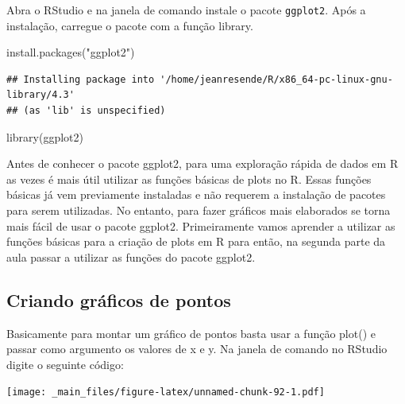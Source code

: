 \documentclass[
]{book}
\newenvironment{Shaded}{\begin{snugshade}}{\end{snugshade}}
\newcommand{\FunctionTok}[1]{\textcolor[rgb]{0.00,0.00,0.00}{#1}}
\newcommand{\NormalTok}[1]{#1}
\newcommand{\SpecialCharTok}[1]{\textcolor[rgb]{0.00,0.00,0.00}{#1}}
\newcommand{\StringTok}[1]{\textcolor[rgb]{0.31,0.60,0.02}{#1}}
\begin{document}
Abra o RStudio e na janela de comando instale o pacote \texttt{ggplot2}. Após a instalação, carregue o pacote com a função library.

\begin{Shaded}
\begin{Highlighting}[]
\FunctionTok{install.packages}\NormalTok{(}\StringTok{"ggplot2"}\NormalTok{)}
\end{Highlighting}
\end{Shaded}

\begin{verbatim}
## Installing package into '/home/jeanresende/R/x86_64-pc-linux-gnu-library/4.3'
## (as 'lib' is unspecified)
\end{verbatim}

\begin{Shaded}
\begin{Highlighting}[]
\FunctionTok{library}\NormalTok{(ggplot2)}
\end{Highlighting}
\end{Shaded}

Antes de conhecer o pacote ggplot2, para uma exploração rápida de dados em R as vezes é mais útil utilizar as funções básicas de plots no R. Essas funções básicas já vem previamente instaladas e não requerem a instalação de pacotes para serem utilizadas. No entanto, para fazer gráficos mais elaborados se torna mais fácil de usar o pacote ggplot2. Primeiramente vamos aprender a utilizar as funções básicas para a criação de plots em R para então, na segunda parte da aula passar a utilizar
as funções do pacote ggplot2.

\hypertarget{criando-gruxe1ficos-de-pontos}{%
\subsection{Criando gráficos de pontos}\label{criando-gruxe1ficos-de-pontos}}

Basicamente para montar um gráfico de pontos basta usar a função plot() e passar como argumento os valores de x e y. Na janela de comando no RStudio digite o seguinte código:

\begin{Shaded}
\end{Shaded}

\texttt{[image: \_main\_files/figure-latex/unnamed-chunk-92-1.pdf]}
\end{document}
